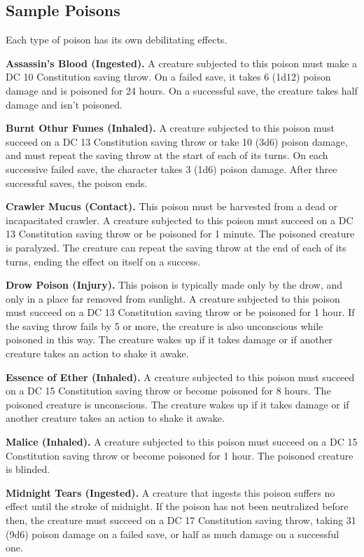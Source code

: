 \documentclass[
]{article}
\begin{document}
\hypertarget{sample-poisons}{%
\subsection{Sample Poisons}\label{sample-poisons}}

Each type of poison has its own debilitating effects.

\textbf{Assassin's Blood (Ingested).} A creature subjected to this
poison must make a DC 10 Constitution saving throw. On a failed save, it
takes 6 (1d12) poison damage and is poisoned for 24 hours. On a
successful save, the creature takes half damage and isn't poisoned.

\textbf{Burnt Othur Fumes (Inhaled).} A creature subjected to this
poison must succeed on a DC 13 Constitution saving throw or take 10
(3d6) poison damage, and must repeat the saving throw at the start of
each of its turns. On each successive failed save, the character takes 3
(1d6) poison damage. After three successful saves, the poison ends.

\textbf{Crawler Mucus (Contact).} This poison must be harvested from a
dead or incapacitated crawler. A creature subjected to this poison must
succeed on a DC 13 Constitution saving throw or be poisoned for 1
minute. The poisoned creature is paralyzed. The creature can repeat the
saving throw at the end of each of its turns, ending the effect on
itself on a success.

\textbf{Drow Poison (Injury).} This poison is typically made only by the
drow, and only in a place far removed from sunlight. A creature
subjected to this poison must succeed on a DC 13 Constitution saving
throw or be poisoned for 1 hour. If the saving throw fails by 5 or more,
the creature is also unconscious while poisoned in this way. The
creature wakes up if it takes damage or if another creature takes an
action to shake it awake.

\textbf{Essence of Ether (Inhaled).} A creature subjected to this poison
must succeed on a DC 15 Constitution saving throw or become poisoned for
8 hours. The poisoned creature is unconscious. The creature wakes up if
it takes damage or if another creature takes an action to shake it
awake.

\textbf{Malice (Inhaled).} A creature subjected to this poison must
succeed on a DC 15 Constitution saving throw or become poisoned for 1
hour. The poisoned creature is blinded.

\textbf{Midnight Tears (Ingested).} A creature that ingests this poison
suffers no effect until the stroke of midnight. If the poison has not
been neutralized before then, the creature must succeed on a DC 17
Constitution saving throw, taking 31 (9d6) poison damage on a failed
save, or half as much damage on a successful one.
\end{document}
